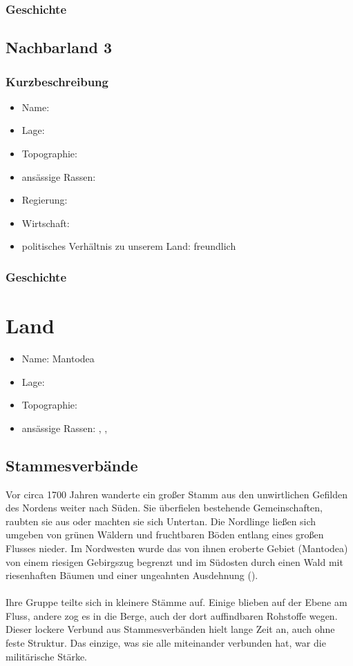 \subsection{Geschichte}

\section{Nachbarland 3}
\subsection{Kurzbeschreibung}
\begin{itemize}
	\item Name: 
	\item Lage:
	\item Topographie:
	\item ansässige Rassen:
	\item Regierung:
	\item Wirtschaft:
	\item politisches Verhältnis zu unserem Land: freundlich
\end{itemize}

\subsection{Geschichte}

\chapter{Land}
\begin{itemize}
	\item Name: Mantodea
	\item Lage: 
	\item Topographie:
	\item ansässige Rassen: , , 
\end{itemize}
\section{Stammesverbände}
Vor circa 1700 Jahren wanderte ein großer Stamm aus den unwirtlichen Gefilden des Nordens weiter nach Süden.
Sie überfielen bestehende Gemeinschaften, raubten sie aus oder machten sie sich Untertan.
Die Nordlinge ließen sich umgeben von grünen Wäldern und fruchtbaren Böden entlang eines großen Flusses nieder.
Im Nordwesten wurde das von ihnen eroberte Gebiet (Mantodea) von einem riesigen Gebirgszug begrenzt und im Südosten durch einen Wald mit riesenhaften Bäumen und einer ungeahnten Ausdehnung ().\\
\\
Ihre Gruppe teilte sich in kleinere Stämme auf.
Einige blieben auf der Ebene am Fluss, andere zog es in die Berge, auch der dort auffindbaren Rohstoffe wegen.
Dieser lockere Verbund aus Stammesverbänden hielt lange Zeit an, auch ohne feste Struktur.
Das einzige, was sie alle miteinander verbunden hat, war die militärische Stärke.

